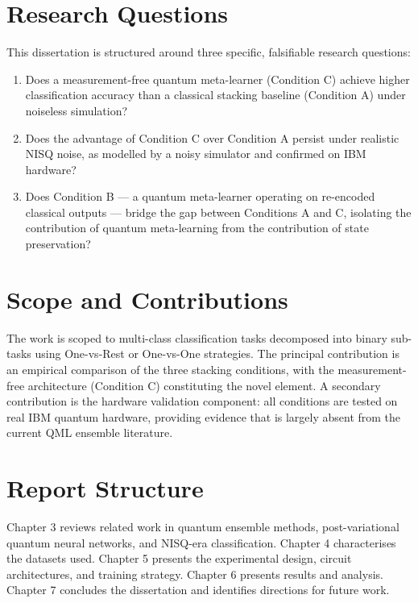 \documentclass[]{UCD_CS_FYP_Report}
\begin{document}
\section{Research Questions}

This dissertation is structured around three specific, falsifiable research questions:

\begin{enumerate}
    \item Does a measurement-free quantum meta-learner (Condition C) achieve higher classification accuracy than a classical stacking baseline (Condition A) under noiseless simulation?
    \item Does the advantage of Condition C over Condition A persist under realistic NISQ noise, as modelled by a noisy simulator and confirmed on IBM hardware?
    \item Does Condition B --- a quantum meta-learner operating on re-encoded classical outputs --- bridge the gap between Conditions A and C, isolating the contribution of quantum meta-learning from the contribution of state preservation?
\end{enumerate}

\section{Scope and Contributions}

The work is scoped to multi-class classification tasks decomposed into binary sub-tasks using One-vs-Rest or One-vs-One strategies. The principal contribution is an empirical comparison of the three stacking conditions, with the measurement-free architecture (Condition C) constituting the novel element. A secondary contribution is the hardware validation component: all conditions are tested on real IBM quantum hardware, providing evidence that is largely absent from the current QML ensemble literature.

\section{Report Structure}

Chapter 3 reviews related work in quantum ensemble methods, post-variational quantum neural networks, and NISQ-era classification. Chapter 4 characterises the datasets used. Chapter 5 presents the experimental design, circuit architectures, and training strategy. Chapter 6 presents results and analysis. Chapter 7 concludes the dissertation and identifies directions for future work.
\end{document}
